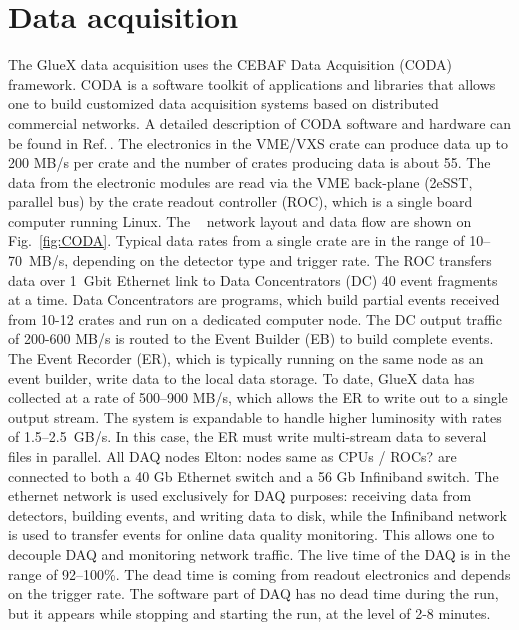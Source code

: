 
\section[Data Acquisition]{Data acquisition \label{sec:daq}}



The GlueX data acquisition uses the CEBAF Data Acquisition (CODA) framework. CODA is a software toolkit of applications and libraries that allows one to build customized data acquisition systems based on distributed commercial networks. A detailed description of CODA software and hardware can be found in Ref.\,\cite{CLASS12_DAQ}. 
The electronics in the VME/VXS crate can produce data up to 200 MB/s per crate and the
number of crates producing data is about 55.
The data from the electronic modules are read via the VME back-plane (2eSST, parallel bus) by the crate readout controller (ROC), which is a single board computer running Linux.
The \gx~ network layout and data flow are shown on Fig.~\ref{fig:CODA}.
Typical data rates from a single crate are in the range of 10--70~MB/s, depending on the detector type and trigger rate.
The ROC transfers data over 1~Gbit Ethernet link to Data Concentrators (DC) 40 event fragments at a time. Data Concentrators are programs, which build partial events received from 10-12 crates and run on a dedicated computer node.
The DC output traffic of 200-600 MB/s is routed to the Event Builder (EB) to build complete events.
The Event Recorder (ER), which is typically running on the same node as an event builder, write data to the local data storage.
To date, GlueX data has collected at a rate of 500--900 MB/s, which allows the ER to write out to a single output stream. The system is expandable to handle higher luminosity with rates of 1.5--2.5~GB/s. In this case, the ER must write multi-stream data to several files in parallel.
All DAQ nodes {\color{red} Elton: nodes same as CPUs / ROCs? } are connected to both a 40 Gb Ethernet switch and a 56 Gb Infiniband switch.
The ethernet network is used exclusively for DAQ purposes: receiving data from detectors, building events, and writing data to disk, 
while the Infiniband network is used to transfer events for online data quality monitoring. 
This allows one to decouple DAQ and monitoring network traffic.
The live time of the DAQ is in the range of 92--100\%. The dead time is coming from readout electronics and depends on the trigger rate.  
The software part of DAQ has no dead time during the run, but it appears while stopping and starting the run, at the level of 2-8 minutes. 




